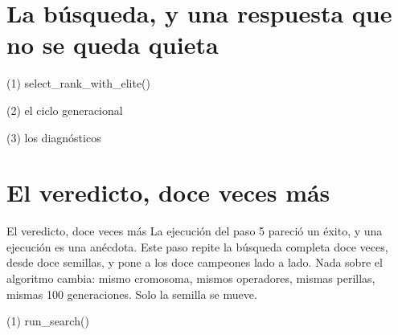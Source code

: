 \section{La búsqueda, y una respuesta que no se queda quieta}



\begin{frame}[fragile]{(1) select\_rank\_with\_elite()}

\end{frame}

\begin{frame}[fragile]{(2) el ciclo generacional}

\end{frame}

\begin{frame}[fragile]{(3) los diagnósticos}

\end{frame}


\section{El veredicto, doce veces más}

\begin{frame}{El veredicto, doce veces más}
La ejecución del paso 5 pareció un éxito, y una ejecución es una anécdota. Este paso
repite la búsqueda completa doce veces, desde doce semillas, y pone a los
doce campeones lado a lado. Nada sobre el algoritmo cambia: mismo
cromosoma, mismos operadores, mismas perillas, mismas 100 generaciones. Solo la semilla
se mueve.
\end{frame}

\begin{frame}[fragile]{(1) run\_search()}

\end{frame}

